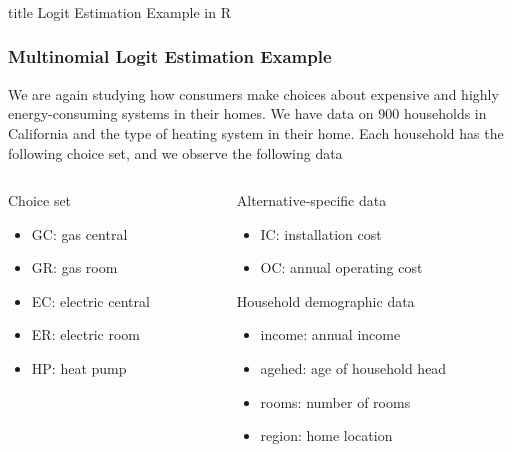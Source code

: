 \documentclass{beamer}
\begin{document}
\begin{frame}\frametitle{}
    \vfill
    \centering
    \begin{beamercolorbox}[center]{title}
        \Large Logit Estimation Example in R
    \end{beamercolorbox}
    \vfill
\end{frame}

\begin{frame}\frametitle{Multinomial Logit Estimation Example}
    We are again studying how consumers make choices about expensive and highly energy-consuming systems in their homes. We have data on 900 households in California and the type of heating system in their home. Each household has the following choice set, and we observe the following data \\
    \vspace{3ex}
    \begin{columns}
    	\begin{column}{0.5\textwidth}
		    Choice set
		    \begin{itemize}
		    	\item GC: gas central
		    	\item GR: gas room
		    	\item EC: electric central
		    	\item ER: electric room
		    	\item HP: heat pump
		    \end{itemize}
		    \vspace{8ex}
	    \end{column}
	    \begin{column}{0.5\textwidth}
		    Alternative-specific data
		    \begin{itemize}
		    	\item IC: installation cost
		    	\item OC: annual operating cost
		    \end{itemize}
		    \vspace{2ex}
		    Household demographic data
		    \begin{itemize}
		    	\item income: annual income
		    	\item agehed: age of household head
		    	\item rooms: number of rooms
                \item region: home location
		    \end{itemize}
		\end{column}
    \end{columns}
\end{frame}
\end{document}
